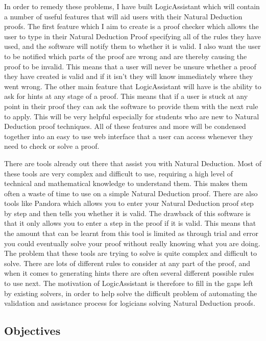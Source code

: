 In order to remedy these problems, I have built LogicAssistant which will contain a number of useful features that will aid users with their Natural Deduction proofs. The first feature which I aim to create is a proof checker which allows the user to type in their Natural Deduction Proof specifying all of the rules they have used, and the software will notify them to whether it is valid. I also want the user to be notified which parts of the proof are wrong and are thereby causing the proof to be invalid. This means that a user will never be unsure whether a proof they have created is valid and if it isn't they will know immediately where they went wrong. The other main feature that LogicAssistant will have is the ability to ask for hints at any stage of a proof. This means that if a user is stuck at any point in their proof they can ask the software to provide them with the next rule to apply. This will be very helpful especially for students who are new to Natural Deduction proof techniques. All of these features and more will be condensed together into an easy to use web interface that a user can access whenever they need to check or solve a proof. 

There are tools already out there that assist you with Natural Deduction. Most of these tools are very complex and difficult to use, requiring a high level of technical and mathematical knowledge to understand them. This makes them often a waste of time to use on a simple Natural Deduction proof. There are also tools like Pandora\cite{pandora} which allows you to enter your Natural Deduction proof step by step and then tells you whether it is valid. The drawback of this software is that it only allows you to enter a step in the proof if it is valid. This means that the amount that can be learnt from this tool is limited as through trial and error you could eventually solve your proof without really knowing what you are doing. The problem that these tools are trying to solve is quite complex and difficult to solve. There are lots of different rules to consider at any part of the proof, and when it comes to generating hints there are often several different possible rules to use next. The motivation of LogicAssistant is therefore to fill in the gaps left by existing solvers, in order to help solve the difficult problem of automating the validation and assistance process for logicians solving Natural Deduction proofs.

\subsection{Objectives \label{objectives}}

